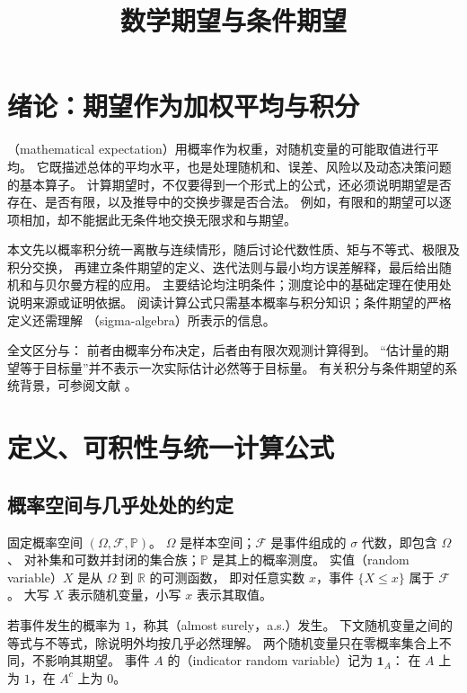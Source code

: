\documentclass[UTF8]{ctexart}
\title{数学期望与条件期望}
\author{}
\date{}
\begin{document}
\maketitle
\tableofcontents

\section{绪论：期望作为加权平均与积分}
\label{sec:expectation-introduction}

（mathematical expectation）用概率作为权重，对随机变量的可能取值进行平均。
它既描述总体的平均水平，也是处理随机和、误差、风险以及动态决策问题的基本算子。
计算期望时，不仅要得到一个形式上的公式，还必须说明期望是否存在、是否有限，以及推导中的交换步骤是否合法。
例如，有限和的期望可以逐项相加，却不能据此无条件地交换无限求和与期望。

本文先以概率积分统一离散与连续情形，随后讨论代数性质、矩与不等式、极限及积分交换，
再建立条件期望的定义、迭代法则与最小均方误差解释，最后给出随机和与贝尔曼方程的应用。
主要结论均注明条件；测度论中的基础定理在使用处说明来源或证明依据。
阅读计算公式只需基本概率与积分知识；条件期望的严格定义还需理解
（sigma-algebra）所表示的信息。

全文区分与：
前者由概率分布决定，后者由有限次观测计算得到。
“估计量的期望等于目标量”并不表示一次实际估计必然等于目标量。
有关积分与条件期望的系统背景，可参阅文献 \cite{durrett-pte,sheffield-probability}。

\section{定义、可积性与统一计算公式}
\label{sec:expectation-definition}

\subsection{概率空间与几乎处处的约定}

固定概率空间 $(\Omega,\mathcal F,\mathbb P)$。
$\Omega$ 是样本空间；$\mathcal F$ 是事件组成的 $\sigma$ 代数，即包含 $\Omega$、
对补集和可数并封闭的集合族；$\mathbb P$ 是其上的概率测度。
实值（random variable）$X$ 是从 $\Omega$ 到 $\mathbb R$ 的可测函数，
即对任意实数 $x$，事件 $\{X\leq x\}$ 属于 $\mathcal F$。
大写 $X$ 表示随机变量，小写 $x$ 表示其取值。

若事件发生的概率为 $1$，称其（almost surely，a.s.）发生。
下文随机变量之间的等式与不等式，除说明外均按几乎必然理解。
两个随机变量只在零概率集合上不同，不影响其期望。
事件 $A$ 的（indicator random variable）记为 $\mathbf1_A$：
在 $A$ 上为 $1$，在 $A^c$ 上为 $0$。
\end{document}
